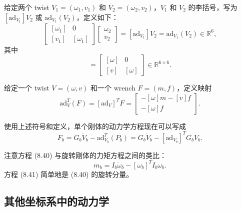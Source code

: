 \documentclass[12pt,a4paper]{article}
\begin{document}
\begin{definition}[定义 8.3]
给定两个 twist $V_1 = (\omega_1, v_1)$ 和 $V_2 = (\omega_2, v_2)$，$V_1$ 和 $V_2$ 的李括号，写为 $[\text{ad}_{V_1}]V_2$ 或 $\text{ad}_{V_1}(V_2)$，定义如下：
\begin{equation}
\begin{bmatrix} [\omega_1] & 0 \\ [v_1] & [\omega_1] \end{bmatrix}\begin{bmatrix} \omega_2 \\ v_2 \end{bmatrix} = [\text{ad}_{V_1}]V_2 = \text{ad}_{V_1}(V_2) \in \mathbb{R}^6, \label{eq:8.37}
\end{equation}
其中
\begin{equation}
[\text{ad}_V] = \begin{bmatrix} [\omega] & 0 \\ [v] & [\omega] \end{bmatrix} \in \mathbb{R}^{6 \times 6}. \label{eq:8.38}
\end{equation}
\end{definition}

\begin{definition}[定义 8.4]
给定一个 twist $V = (\omega, v)$ 和一个 wrench $F = (m, f)$，定义映射
\begin{equation}
\text{ad}_V^T(F) = [\text{ad}_V]^T F = \begin{bmatrix} -[\omega]m - [v]f \\ -[\omega]f \end{bmatrix}. \label{eq:8.39}
\end{equation}
\end{definition}

使用上述符号和定义，单个刚体的动力学方程现在可以写成
\begin{equation}
F_b = G_b \dot{V}_b - \text{ad}_{V_b}^T(P_b) = G_b \dot{V}_b - [\text{ad}_{V_b}]^T G_b V_b. \label{eq:8.40}
\end{equation}

注意方程 (8.40) 与旋转刚体的力矩方程之间的类比：
\begin{equation}
m_b = I_b \dot{\omega}_b - [\omega_b]^T I_b \omega_b. \label{eq:8.41}
\end{equation}
方程 (8.41) 简单地是 (8.40) 的旋转分量。

\subsection{其他坐标系中的动力学}
\end{document}

